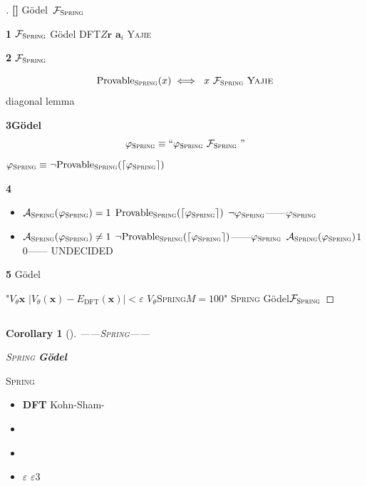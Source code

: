 \documentclass[12pt,a4paper]{article}
\newtheorem{corollary}[theorem]{Corollary}
\theoremstyle{remark}
\newcommand{\Fset}{\mathcal{F}}
\newcommand{\Spring}{\textsc{Spring}}
\newcommand{\Yajie}{\textsc{Yajie}}
\newcommand{\rigorous}{\textnormal{\textbf{[]}}}
\begin{document}
\begin{proof}[]\rigorous
G\"odel~\cite{godel1931}$\Fset_{\Spring}$

\textbf{1} $\Fset_{\Spring}$
G\"odel
DFT$Z$$\mathbf{r}$
$\mathbf{a}_i$
\Yajie{}

\textbf{2} $\Fset_{\Spring}$

\begin{equation}
    \mathrm{Provable}_{\Spring}(x) \iff
    \text{ } x \text{  } \Fset_{\Spring} \text{ \Yajie{}}
\end{equation}
diagonal lemma~\cite{boolos2007}


\textbf{3G\"odel} 
\begin{equation}
    \varphi_{\Spring} \equiv \text{“}\varphi_{\Spring} \text{  } \Fset_{\Spring} \text{ ”}
\end{equation}
$\varphi_{\Spring} \equiv \neg \mathrm{Provable}_{\Spring}(\lceil \varphi_{\Spring} \rceil)$

\textbf{4} 
\begin{itemize}[itemsep=2pt]
    \item $\mathcal{A}_{\Spring}(\varphi_{\Spring}) = 1$
    $\mathrm{Provable}_{\Spring}(\lceil \varphi_{\Spring} \rceil)$
    $\neg \varphi_{\Spring}$——$\varphi_{\Spring}$
    \item $\mathcal{A}_{\Spring}(\varphi_{\Spring}) \neq 1$
    $\neg \mathrm{Provable}_{\Spring}(\lceil \varphi_{\Spring} \rceil)$——$\varphi_{\Spring}$
    $\mathcal{A}_{\Spring}(\varphi_{\Spring})$$1$$0$——
    \textsc{UNDECIDED}
\end{itemize}

\textbf{5} G\"odel

"$V_\theta$$\mathbf{x}$
$|V_\theta(\mathbf{x}) - E_{\text{DFT}}(\mathbf{x})| < \varepsilon$
$V_\theta$\Spring{}$M=100$"
\Spring{}
G\"odel$\Fset_{\Spring}$
\end{proof}

\subsection{}



\begin{corollary}[]\label{cor:axiom}
——\Spring{}——

\Spring{}\textbf{
G\"odel}
\end{corollary}

\Spring{}
\begin{itemize}[itemsep=2pt]
    \item \textbf{DFT} Kohn-Sham-
    \item \textbf{} 
    \item \textbf{} 
    \item \textbf{} $\varepsilon$
    $\varepsilon$3
\end{itemize}
\end{document}
